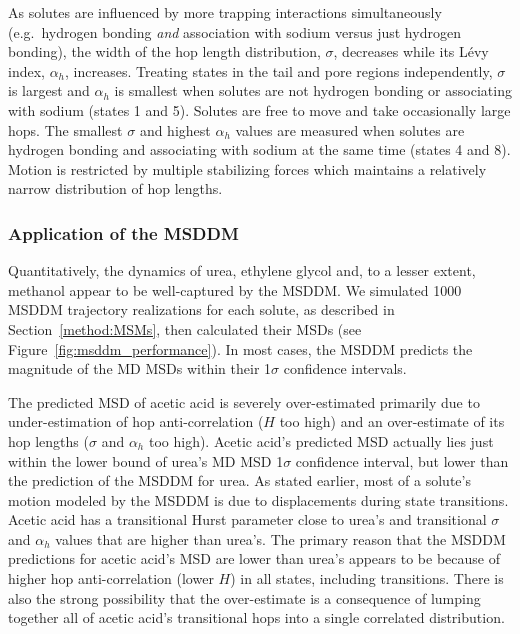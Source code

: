 \documentclass[journal=ancac3,manuscript=article,layout=twocolumn]{achemso}
\begin{document}
  As solutes are influenced by more trapping interactions simultaneously
  (e.g.~hydrogen bonding \textit{and} association with sodium versus just
  hydrogen bonding), the width of the hop length distribution, $\sigma$,
  decreases while its L\'evy index, $\alpha_h$, increases. Treating states in
  the tail and pore regions independently, $\sigma$ is largest and $\alpha_h$
  is smallest when solutes are not hydrogen bonding or associating with sodium
  (states 1 and 5). Solutes are free to move and take occasionally large hops.
  The smallest $\sigma$ and highest $\alpha_h$ values are measured when solutes
  are hydrogen bonding and associating with sodium at the same time (states 4
  and 8). Motion is restricted by multiple stabilizing forces which maintains a
  relatively narrow distribution of hop lengths.
  
  \subsubsection{Application of the MSDDM}\label{section:msddm_application}
  
  Quantitatively, the dynamics of urea, ethylene glycol and, to a lesser extent, 
  methanol appear to be well-captured by the MSDDM. We simulated 1000 MSDDM trajectory realizations
  for each solute, as described in Section~\ref{method:MSMs}, then calculated their
  MSDs (see Figure~\ref{fig:msddm_performance}). In most cases, the MSDDM predicts
  the magnitude of the MD MSDs within their 1$\sigma$ confidence intervals. 
 
  The predicted MSD of acetic acid is severely over-estimated primarily due to
  under-estimation of hop anti-correlation ($H$ too high) and an over-estimate
  of its hop lengths ($\sigma$ and $\alpha_h$ too high). Acetic acid's
  predicted MSD actually lies just within the lower bound of urea's MD MSD
  1$\sigma$ confidence interval, but lower than the prediction of the MSDDM for
  urea. As stated earlier, most of a solute’s motion modeled by the MSDDM is
  due to displacements during state transitions. Acetic acid has a transitional
  Hurst parameter close to urea’s and transitional $\sigma$ and $\alpha_h$
  values that are higher than urea’s. The primary reason that the MSDDM
  predictions for acetic acid's MSD are lower than urea's appears to be because
  of higher hop anti-correlation (lower $H$) in all states, including
  transitions. There is also the strong possibility that the over-estimate is
  a consequence of lumping together all of acetic acid’s transitional hops into
  a single correlated distribution.
\end{document}

